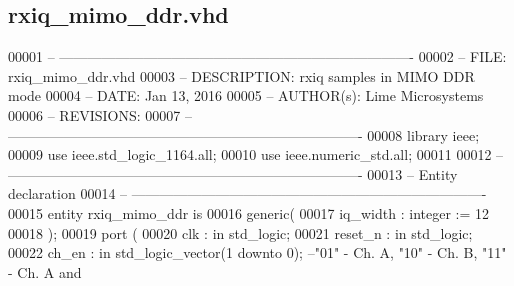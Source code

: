 \subsection{rxiq\+\_\+mimo\+\_\+ddr.\+vhd}
\label{rxiq__mimo__ddr_8vhd_source}

\begin{DoxyCode}
00001 \textcolor{keyword}{-- ---------------------------------------------------------------------------- }
00002 \textcolor{keyword}{-- FILE:    rxiq\_mimo\_ddr.vhd}
00003 \textcolor{keyword}{-- DESCRIPTION: rxiq samples in MIMO DDR mode}
00004 \textcolor{keyword}{-- DATE:    Jan 13, 2016}
00005 \textcolor{keyword}{-- AUTHOR(s):   Lime Microsystems}
00006 \textcolor{keyword}{-- REVISIONS:}
00007 \textcolor{keyword}{-- ---------------------------------------------------------------------------- }
00008 \textcolor{vhdlkeyword}{library }\textcolor{keywordflow}{ieee};
00009 \textcolor{vhdlkeyword}{use }ieee.std\_logic\_1164.\textcolor{keywordflow}{all};
00010 \textcolor{vhdlkeyword}{use }ieee.numeric\_std.\textcolor{keywordflow}{all};
00011 
00012 \textcolor{keyword}{-- ----------------------------------------------------------------------------}
00013 \textcolor{keyword}{-- Entity declaration}
00014 \textcolor{keyword}{-- ----------------------------------------------------------------------------}
00015 \textcolor{keywordflow}{entity }rxiq_mimo_ddr \textcolor{keywordflow}{is}
00016    \textcolor{keywordflow}{generic}\textcolor{vhdlchar}{(}
00017       \textcolor{vhdlchar}{iq_width}      \textcolor{vhdlchar}{:} \textcolor{comment}{integer} \textcolor{vhdlchar}{:=} \textcolor{vhdllogic}{}\textcolor{vhdllogic}{12}
00018    \textcolor{vhdlchar}{)};
00019   \textcolor{keywordflow}{port} \textcolor{vhdlchar}{(}
00020       \textcolor{vhdlchar}{clk}         \textcolor{vhdlchar}{:} \textcolor{keywordflow}{in} \textcolor{comment}{std\_logic};
00021       \textcolor{vhdlchar}{reset_n}     \textcolor{vhdlchar}{:} \textcolor{keywordflow}{in} \textcolor{comment}{std\_logic};
00022         \textcolor{vhdlchar}{ch_en}           \textcolor{vhdlchar}{:} \textcolor{keywordflow}{in} \textcolor{comment}{std\_logic\_vector}\textcolor{vhdlchar}{(}\textcolor{vhdllogic}{}\textcolor{vhdllogic}{1} \textcolor{keywordflow}{downto} \textcolor{vhdllogic}{}\textcolor{vhdllogic}{0}\textcolor{vhdlchar}{)};\textcolor{keyword}{ --"01" - Ch. A, "10" - Ch. B, "11" - Ch. A and
}
\end{DoxyCode}
